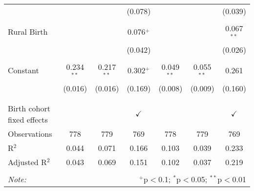\begin{table}[!htbp]
\begin{tabular}{@{\extracolsep{5pt}}lcccccc}
  &  &  & (0.078) &  &  & (0.039) \\ 
  & & & & & & \\ 
 Rural Birth &  &  & 0.076$^{+}$ &  &  & 0.067$^{**}$ \\ 
  &  &  & (0.042) &  &  & (0.026) \\ 
  & & & & & & \\ 
 Constant & 0.234$^{**}$ & 0.217$^{**}$ & 0.302$^{+}$ & 0.049$^{**}$ & 0.055$^{**}$ & 0.261 \\ 
  & (0.016) & (0.016) & (0.169) & (0.008) & (0.009) & (0.160) \\ 
  & & & & & & \\ 
\hline \\[-1.8ex] 
Birth cohort fixed effects &  &  & $\checkmark$ &  &  & $\checkmark$ \\ 
Observations & 778 & 779 & 769 & 778 & 779 & 769 \\ 
R$^{2}$ & 0.044 & 0.071 & 0.166 & 0.103 & 0.039 & 0.233 \\ 
Adjusted R$^{2}$ & 0.043 & 0.069 & 0.151 & 0.102 & 0.037 & 0.219 \\ 
\hline 
\hline \\[-1.8ex] 
\textit{Note:}  & \multicolumn{6}{r}{$^{+}$p$<$0.1; $^{*}$p$<$0.05; $^{**}$p$<$0.01}} \\ 
\end{tabular} 
\end{table} 
